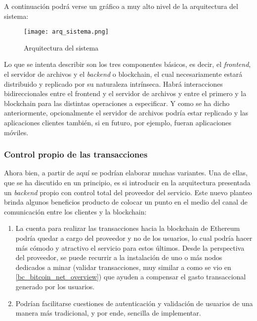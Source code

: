 A continuación podrá verse un gráfico a muy alto nivel de la arquitectura del sistema:

\begin{figure}[H]
  \texttt{[image: arq\_sistema.png]}
  \centering
  \caption{Arquitectura del sistema}
  \label{fig:arq-sistema}
\end{figure}

Lo que se intenta describir son los tres componentes básicos, es decir, el \textit{frontend}, el servidor de archivos y el \textit{backend} o blockchain, el cual necesariamente estará distribuido y replicado por su naturaleza intrínseca. Habrá interacciones bidireccionales entre el frontend y el servidor de archivos y entre el primero y la blockchain para las distintas operaciones a especificar. Y como se ha dicho anteriormente, opcionalmente el servidor de archivos podría estar replicado y las aplicaciones clientes también, si en futuro, por ejemplo, fueran aplicaciones móviles.

\subsubsection{Control propio de las transacciones}
\label{control_propio_transacciones}

Ahora bien, a partir de aquí se podrían elaborar muchas variantes. Una de ellas, que se ha discutido en un principio, es si introducir en la arquitectura presentada un \textit{backend} propio con control total del proveedor del servicio. Este nuevo planteo brinda algunos beneficios producto de colocar un punto en el medio del canal de comunicación entre los clientes y la blockchain:

\begin{enumerate}
  \item La cuenta para realizar las transacciones hacia la blockchain de Ethereum podría quedar a cargo del proveedor y no de los usuarios, lo cual podría hacer más cómodo y atractivo el servicio para estos últimos. Desde la perspectiva del proveedor, se puede recurrir a la instalación de uno o más nodos dedicados a minar (validar transacciones, muy similar a como se vio en \ref{bc_bitcoin_net_overview}) que ayuden a compensar el gasto transaccional generado por los usuarios.
  \item Podrían facilitarse cuestiones de autenticación y validación de usuarios de una manera más tradicional, y por ende, sencilla de implementar.
\end{enumerate}

